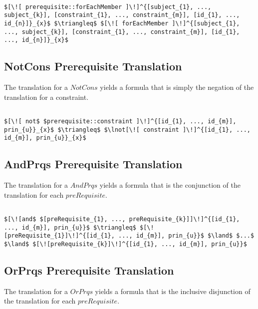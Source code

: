 \lstset{mathescape, language=AST}  
\begin{lstlisting}[frame=single, caption={Prerequisite Translation {$\colon$} ForEachMember},label={lst:transpreRequisiteForEachMember}]

$[\![ prerequisite::forEachMember ]\!]^{[subject_{1}, ..., subject_{k}], [constraint_{1}, ..., constraint_{m}], [id_{1}, ..., id_{n}]}_{x}$ $\triangleq$ $[\![ forEachMember ]\!]^{[subject_{1}, ..., subject_{k}], [constraint_{1}, ..., constraint_{m}], [id_{1}, ..., id_{n}]}_{x}$ 	
\end{lstlisting}

\subsection{NotCons Prerequisite Translation}
The translation for a $NotCons$ yields a formula that is simply the negation of the translation for a constraint.

\lstset{mathescape, language=AST}  
\begin{lstlisting}[frame=single, caption={Prerequisite Translation {$\colon$} Not Constraint},label={lst:transpreRequisiteNotConstraint}]

$[\![ not$ $prerequisite::constraint ]\!]^{[id_{1}, ..., id_{m}], prin_{u}}_{x}$ $\triangleq$ $\lnot[\![ constraint ]\!]^{[id_{1}, ..., id_{m}], prin_{u}}_{x}$ 
\end{lstlisting}

\subsection{AndPrqs Prerequisite Translation}
The translation for a $AndPrqs$ yields a formula that is the conjunction of the translation for each $preRequisite$.

\lstset{mathescape, language=AST}  
\begin{lstlisting}[frame=single, caption={Prerequisite Translation {$\colon$} Conjunction },label={lst:transpreRequisiteAndPrqs}]

$[\![and$ $[preRequisite_{1}, ..., preRequisite_{k}]]\!]^{[id_{1}, ..., id_{m}], prin_{u}}$ $\triangleq$ $[\![preRequisite_{1}]\!]^{[id_{1}, ..., id_{m}], prin_{u}}$ $\land$ $...$ $\land$ $[\![preRequisite_{k}]\!]^{[id_{1}, ..., id_{m}], prin_{u}}$

\end{lstlisting}

\subsection{OrPrqs Prerequisite Translation}
The translation for a $OrPrqs$ yields a formula that is the inclusive disjunction of the translation for each $preRequisite$.

